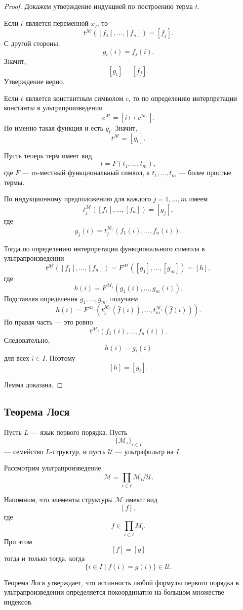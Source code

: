 \documentclass[12pt,a4paper,oneside,openany]{book}
\theoremstyle{definition}
\theoremstyle{plain}
\theoremstyle{remark}
\begin{document}
\begin{proof}
Докажем утверждение индукцией по построению терма $t$.

Если $t$ является переменной $x_j$, то
\[
t^{\mathcal M}([f_1],\ldots,[f_n])
=
[f_j].
\]
С другой стороны,
\[
g_t(i)=f_j(i).
\]
Значит,
\[
[g_t]=[f_j].
\]
Утверждение верно.

Если $t$ является константным символом $c$, то по определению интерпретации константы в ультрапроизведении
\[
c^{\mathcal M}
=
[i\mapsto c^{\mathcal M_i}].
\]
Но именно такая функция и есть $g_t$. Значит,
\[
t^{\mathcal M}=[g_t].
\]

Пусть теперь терм имеет вид
\[
t=F(t_1,\ldots,t_m),
\]
где $F$ — $m$-местный функциональный символ, а $t_1,\ldots,t_m$ — более простые термы.

По индукционному предположению для каждого $j=1,\ldots,m$ имеем
\[
t_j^{\mathcal M}([f_1],\ldots,[f_n])
=
[g_j],
\]
где
\[
g_j(i)=
t_j^{\mathcal M_i}(f_1(i),\ldots,f_n(i)).
\]

Тогда по определению интерпретации функционального символа в ультрапроизведении
\[
t^{\mathcal M}([f_1],\ldots,[f_n])
=
F^{\mathcal M}([g_1],\ldots,[g_m])
=
[h],
\]
где
\[
h(i)=
F^{\mathcal M_i}(g_1(i),\ldots,g_m(i)).
\]
Подставляя определения $g_1,\ldots,g_m$, получаем
\[
h(i)
=
F^{\mathcal M_i}
\left(
t_1^{\mathcal M_i}(\bar f(i)),
\ldots,
t_m^{\mathcal M_i}(\bar f(i))
\right).
\]
Но правая часть — это ровно
\[
t^{\mathcal M_i}(f_1(i),\ldots,f_n(i)).
\]
Следовательно,
\[
h(i)=g_t(i)
\]
для всех $i\in I$. Поэтому
\[
[h]=[g_t].
\]

Лемма доказана.
\end{proof}


\subsection{Теорема Лося}

Пусть $L$ — язык первого порядка. Пусть
\[
\{\mathcal M_i\}_{i\in I}
\]
— семейство $L$-структур, и пусть $\mathcal U$ — ультрафильтр на $I$.

Рассмотрим ультрапроизведение
\[
\mathcal M=
\prod_{i\in I}\mathcal M_i/\mathcal U.
\]

Напомним, что элементы структуры $\mathcal M$ имеют вид
\[
[f],
\]
где
\[
f\in\prod_{i\in I}M_i.
\]
При этом
\[
[f]=[g]
\]
тогда и только тогда, когда
\[
\{i\in I\mid f(i)=g(i)\}\in\mathcal U.
\]

Теорема Лося утверждает, что истинность любой формулы первого порядка в ультрапроизведении определяется покоординатно на большом множестве индексов.
\end{document}
